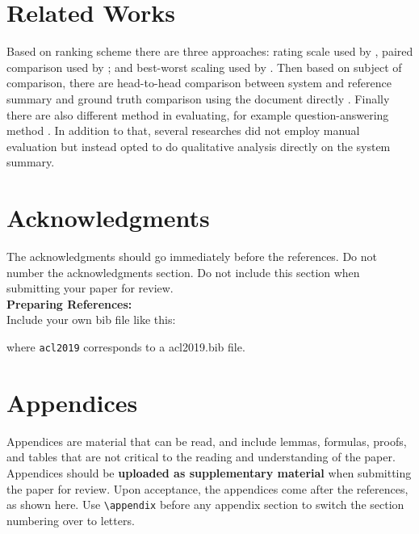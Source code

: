 \documentclass[11pt,a4paper]{article}
\begin{document}
\section{Related Works}
Based on ranking scheme there are three approaches: rating scale \citep{Likert1932} used by \citet{Kryscinski2018}, paired comparison \citep{Thurstone1994} used by \citet{Fan2018, Celikyilmaz2018}; and best-worst scaling \citep{Woodworth1991} used by \citet{Shashi2018}. Then based on subject of comparison, there are head-to-head comparison between system and reference summary \citep{Celikyilmaz2018} and ground truth comparison using the document directly \citep{Shashi2018, Kryscinski2018}. Finally there are also different method in evaluating, for example question-answering method \citep{Clarke2010, Shashi2018}. In addition to that, several researches \citep{Nallapati2016a, See2017, Gehrmann2018} did not employ manual evaluation but instead opted to do qualitative analysis directly on the system summary.

\section*{Acknowledgments}

The acknowledgments should go immediately before the references.  Do
not number the acknowledgments section. Do not include this section
when submitting your paper for review. \\

\noindent \textbf{Preparing References:} \\
Include your own bib file like this:
\verb||
\verb|| 

where \verb|acl2019| corresponds to a acl2019.bib file.



\appendix

\section{Appendices}
\label{sec:appendix}
Appendices are material that can be read, and include lemmas, formulas, proofs, and tables that are not critical to the reading and understanding of the paper. 
Appendices should be \textbf{uploaded as supplementary material} when submitting the paper for review. Upon acceptance, the appendices come after the references, as shown here. Use
\verb|\appendix| before any appendix section to switch the section
numbering over to letters.
\end{document}
